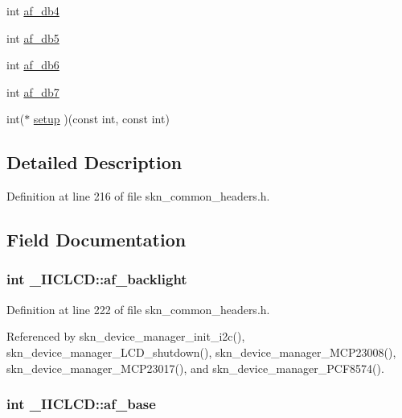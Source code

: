 \begin{DoxyCompactItemize}
\item 
int \hyperlink{struct___i_i_c_l_c_d_adbfc88b661d5da527aad6f5bcd45a85c}{af\+\_\+db4}
\item 
int \hyperlink{struct___i_i_c_l_c_d_a41c4536106493476b52c9a9df9dd8599}{af\+\_\+db5}
\item 
int \hyperlink{struct___i_i_c_l_c_d_a0f3ebbe756ecf62494733287f64821f9}{af\+\_\+db6}
\item 
int \hyperlink{struct___i_i_c_l_c_d_ae55385ca612fd157fb85e7b3d5423ee4}{af\+\_\+db7}
\item 
int($\ast$ \hyperlink{struct___i_i_c_l_c_d_a6bc8b9b3e5e69bfa25fdcd6b3c27628e}{setup} )(const int, const int)
\end{DoxyCompactItemize}


\subsection{Detailed Description}


Definition at line 216 of file skn\+\_\+common\+\_\+headers.\+h.



\subsection{Field Documentation}
\hypertarget{struct___i_i_c_l_c_d_ad160086a31276fbaf849855519b9878e}{
\subsubsection[{af\+\_\+backlight}]{\setlength{\rightskip}{0pt plus 5cm}int \+\_\+\+I\+I\+C\+L\+C\+D\+::af\+\_\+backlight}}\label{struct___i_i_c_l_c_d_ad160086a31276fbaf849855519b9878e}


Definition at line 222 of file skn\+\_\+common\+\_\+headers.\+h.



Referenced by skn\+\_\+device\+\_\+manager\+\_\+init\+\_\+i2c(), skn\+\_\+device\+\_\+manager\+\_\+\+L\+C\+D\+\_\+shutdown(), skn\+\_\+device\+\_\+manager\+\_\+\+M\+C\+P23008(), skn\+\_\+device\+\_\+manager\+\_\+\+M\+C\+P23017(), and skn\+\_\+device\+\_\+manager\+\_\+\+P\+C\+F8574().

\hypertarget{struct___i_i_c_l_c_d_ae74954b1b96523d617a68e42c2663086}{
\subsubsection[{af\+\_\+base}]{\setlength{\rightskip}{0pt plus 5cm}int \+\_\+\+I\+I\+C\+L\+C\+D\+::af\+\_\+base}}\label{struct___i_i_c_l_c_d_ae74954b1b96523d617a68e42c2663086}


